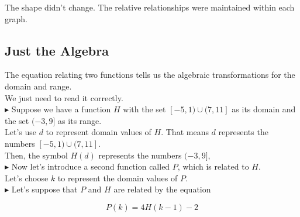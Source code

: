 \documentclass{ximera}
\begin{document}
The shape didn't change.  The relative relationships were maintained within each graph.



























\subsection*{Just the Algebra}











The equation relating two functions tells us the algebraic transformations for the domain and range. \\

We just need to read it correctly. \\



\textbf{\textcolor{blue!55!black}{$\blacktriangleright$}}  Suppose we have a function $H$ with the set $[-5, 1) \cup (7, 11]$ as its domain and the set $(-3, 9]$ as its range. \\

Let's use $d$ to represent domain values of $H$.  That means $d$ represents the numbers $[-5, 1) \cup (7, 11]$. \\

Then, the symbol $H(d)$ represents the numbers $(-3, 9]$, \\


\textbf{\textcolor{blue!55!black}{$\blacktriangleright$}} Now let's introduce a second function called $P$, which is related to $H$. \\

Let's choose $k$ to represent the domain values of $P$. \\


\textbf{\textcolor{blue!55!black}{$\blacktriangleright$}} Let's suppose that $P$ and $H$ are related by the equation 

\[ 
P(k) = 4 H(k-1) - 2
\]
\end{document}
